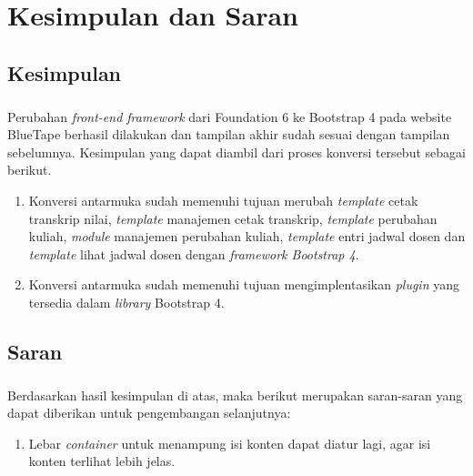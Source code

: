 \chapter{Kesimpulan dan Saran}
\section{Kesimpulan}
\paragraph{} Perubahan \textit{front-end framework} dari Foundation 6 ke Bootstrap 4 pada website BlueTape berhasil dilakukan dan tampilan akhir sudah sesuai dengan tampilan sebelumnya. Kesimpulan yang dapat diambil dari proses konversi tersebut sebagai berikut. 
\begin{enumerate}
	\item Konversi antarmuka sudah memenuhi tujuan merubah \textit{template} cetak transkrip nilai, \textit{template} manajemen cetak transkrip, \textit{template} perubahan kuliah, \textit{module} manajemen perubahan kuliah, \textit{template} entri jadwal dosen dan \textit{template} lihat jadwal dosen dengan \textit{framework Bootstrap 4}.
	\item Konversi antarmuka sudah memenuhi tujuan mengimplentasikan \textit{plugin} yang tersedia dalam \textit{library} Bootstrap 4.
\end{enumerate}

\section{Saran}
\paragraph{}Berdasarkan hasil kesimpulan di atas, maka berikut merupakan saran-saran yang dapat diberikan untuk pengembangan selanjutnya:
\begin{enumerate}
	\item Lebar \textit{container} untuk menampung isi konten dapat diatur lagi, agar isi konten terlihat lebih jelas.
\end{enumerate}